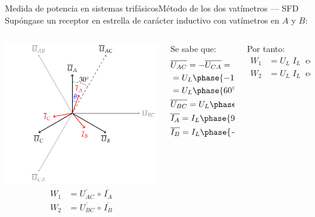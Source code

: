 \documentclass[aspectratio=169, xcolor={usenames,svgnames,dvipsnames}]{beamer}
\begin{document}
\begin{frame}{Medida de potencia en sistemas trifásicos}{Método de los dos vatímetros --- SFD}
Supóngase un receptor en estrella de carácter inductivo con vatímetros en $A$ y $B$:
\begin{columns}
\begin{column}{0.38\columnwidth}
	    \centering
	    \includegraphics[width=0.9\linewidth]{../figs/fasores_potencia3H.pdf}
	    \begin{align*}
	    W_1&=\overline{U_{AC}}\,\circ\,\overline{I_A}\\ 
	    W_2&=\overline{U_{BC}}\,\circ\,\overline{I_B}
	\end{align*}
\end{column}
\pause
\begin{column}{0.3\columnwidth}
	Se sabe que:
	\begin{align*}
	   &\overline{U_{AC}}=-\overline{U_{CA}}=\\
	   &=U_L\phase{-120^\circ-180^\circ}=\\
	   &=U_L\phase{60^\circ}\\ &\overline{U_{BC}}=U_L\phase{0^\circ}\\ &\overline{I_A}=I_L\phase{90^\circ-\theta}\\ &\overline{I_B}=I_L\phase{-30^\circ-\theta} 
	\end{align*}
\end{column}
\pause
\begin{column}{0.3\linewidth}
Por tanto: 
	\begin{align*}
	    W_1&=U_L\;I_L\;\cos{(\theta-30^\circ)}\\ W_2&={U_L}\; {I_L}\;\cos{(\theta+30^\circ)}
	\end{align*}
\end{column}
\end{columns}
\end{frame}
\end{document}
